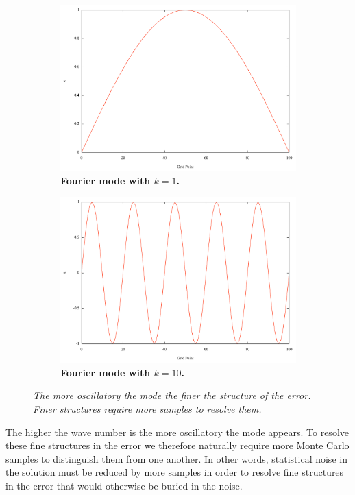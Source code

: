 \documentclass[note]{TechNote}
\begin{document}
\begin{figure}[t!]
  \centering
  \begin{subfigure}[b]{0.49\textwidth}
    \includegraphics[width=\textwidth]{mode_1.pdf}
    \caption{\textbf{Fourier mode with $k = 1$.}}
  \end{subfigure}
  \begin{subfigure}[b]{0.49\textwidth}
    \includegraphics[width=\textwidth]{mode_10.pdf}
    \caption{\textbf{Fourier mode with $k = 10$.}}
  \end{subfigure}
  \caption{\textit{The more oscillatory the mode the finer the
      structure of the error. Finer structures require more samples to
      resolve them.}}
  \label{fig:fourier_modes}
\end{figure}
The higher the wave number is the more oscillatory the mode
appears. To resolve these fine structures in the error we therefore
naturally require more Monte Carlo samples to distinguish them from
one another. In other words, statistical noise in the solution must be
reduced by more samples in order to resolve fine structures in the
error that would otherwise be buried in the noise.
\end{document}
